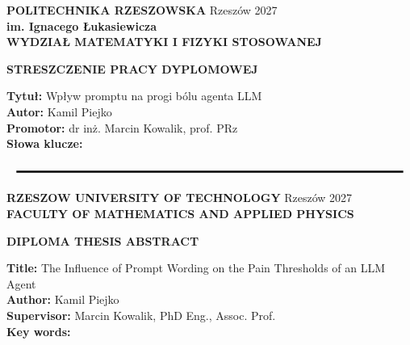 \thispagestyle{empty}
\setlength{\parindent}{0in}
\setlength{\parskip}{0em}

\textbf{POLITECHNIKA RZESZOWSKA} \hfill Rzeszów 2027 \\
\textbf{im. Ignacego Łukasiewicza} \\
\textbf{WYDZIAŁ MATEMATYKI I FIZYKI STOSOWANEJ} \\

\begin{center}
	\textbf{STRESZCZENIE  PRACY  DYPLOMOWEJ }
\end{center}

\textbf{Tytuł:} Wpływ promptu na progi bólu agenta LLM \\
\textbf{Autor:} Kamil Piejko \\
\textbf{Promotor:} dr inż. Marcin Kowalik, prof. PRz \\
\textbf{Słowa klucze:} 
\\



\vfill
$$\noindent\rule{\textwidth}{2pt}$$



\textbf{RZESZOW UNIVERSITY OF TECHNOLOGY} \hfill Rzeszów 2027 \\
\textbf{FACULTY OF MATHEMATICS AND APPLIED PHYSICS } \\

\begin{center}
	\textbf{DIPLOMA THESIS ABSTRACT}
\end{center}

\textbf{Title:} The Influence of Prompt Wording on the Pain Thresholds of an LLM Agent \\
\textbf{Author:} Kamil Piejko \\
\textbf{Supervisor:} Marcin Kowalik, PhD Eng., Assoc. Prof.  \\ %

\textbf{Key words:} 
\\


\vfill

